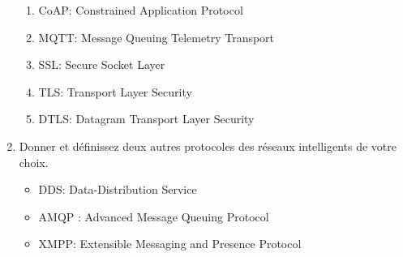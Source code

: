 \begin{enumerate}
\begin{enumerate}
              \item CoAP: Constrained Application Protocol
              \item MQTT: Message Queuing Telemetry Transport
              \item SSL: Secure Socket Layer
              \item TLS: Transport Layer Security
              \item DTLS: Datagram Transport Layer Security
          \end{enumerate}
    \item Donner et définissez deux autres protocoles des réseaux intelligents de votre choix.
          \begin{itemize}
              \item DDS: Data-Distribution Service
              \item AMQP : Advanced Message Queuing Protocol
              \item XMPP: Extensible Messaging and Presence Protocol
          \end{itemize}
\end{enumerate}

